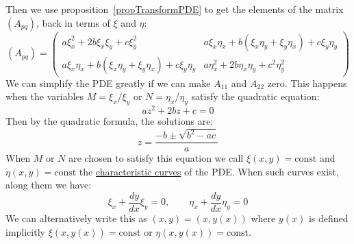 \documentclass[../Main.tex]{subfiles}
\begin{document}
Then we use proposition~\ref{propTransformPDE} to get the elements of the matrix $(A_{pq})$, back in terms of $\xi$ and $\eta$:
\begin{equation*}
    (A_{pq}) =
    \begin{pmatrix}
        a \xi_x^2 + 2b \xi_x \xi_y + c\xi_y^2 & a\xi_x\eta_x + b(\xi_x \eta_y + \xi_y \eta_x) + c \xi_y \eta_y \\
        a\xi_x\eta_x + b(\xi_x \eta_y + \xi_y \eta_x) + c \xi_y \eta_y & a\eta_x^2 + 2b\eta_x\eta_y + c^2 \eta_y^2
    \end{pmatrix}
\end{equation*}
We can simplify the PDE greatly if we can make $A_{11}$ and $A_{22}$ zero. This happens when the variables $M = \xi_x / \xi_y$ or $N = \eta_x / \eta_y$ satisfy the quadratic equation:
\begin{equation*}
    az^2 + 2bz + c = 0
\end{equation*}
Then by the quadratic formula, the solutions are:
\begin{equation*}
    z = \frac{-b \pm \sqrt{b^2 - ac}}{a}
\end{equation*}
When $M$ or $N$ are chosen to satisfy this equation we call $\xi(x, y) = \text{const}$ and $\eta(x, y) = \text{const}$ the \underline{characteristic curves} of the PDE. When such curves exist, along them we have:
\begin{equation*}
    \xi_x + \frac{dy}{dx} \xi_y = 0,\qquad \eta_x + \frac{dy}{dx} \eta_y = 0
\end{equation*}
We can alternatively write this as $(x, y) = (x, y(x))$ where $y(x)$ is defined implicitly $\xi(x, y(x)) = \text{const}$ or $\eta(x, y(x)) = \text{const}$.
\end{document}
